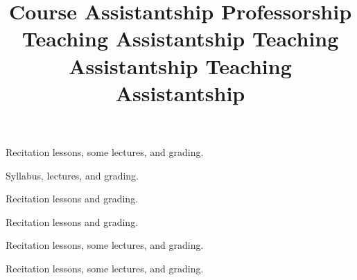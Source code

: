 \title{ Course Assistantship }
\begin{position}
Recitation lessons, some lectures, and grading.
\end{position}

\title{ Professorship }
\begin{position} 
Syllabus, lectures, and grading. 
\end{position}


\title{ Teaching Assistantship }
\begin{position}
Recitation lessons and grading. 
\end{position}

\title{ Teaching Assistantship }
\begin{position}
Recitation lessons and grading.
\end{position}

\title{ Teaching Assistantship}
\begin{position}
Recitation lessons, some lectures, and grading.
\end{position}

\begin{position}
Recitation lessons, some lectures, and grading.
\end{position}
